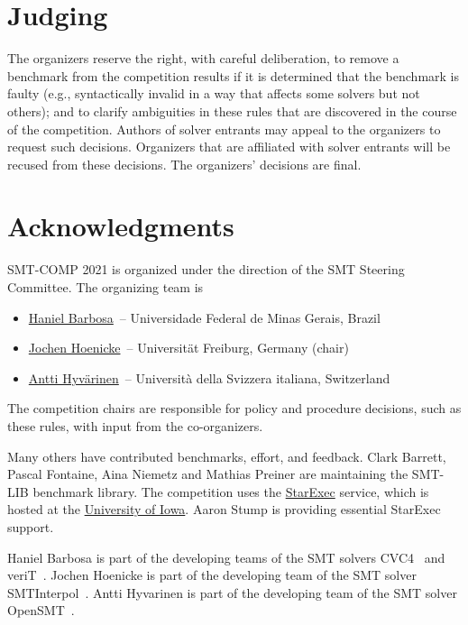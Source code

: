 \documentclass[12pt]{article}
\begin{document}

\section{Judging}

The organizers reserve the right, with careful deliberation, to remove
a benchmark from the competition results if it is determined that the
benchmark is faulty (e.g., syntactically invalid in a way that affects
some solvers but not others); and to clarify ambiguities in these
rules that are discovered in the course of the competition.  Authors
of solver entrants may appeal to the organizers to request such
decisions.  Organizers that are affiliated with solver entrants will
be recused from these decisions.  The organizers' decisions are final.


\section{Acknowledgments}

SMT-COMP 2021 is organized under the direction of the SMT Steering
Committee. The organizing team is
%
\begin{itemize}
\setlength{\itemsep}{0pt}
\item \href{http://homepages.dcc.ufmg.br/~hbarbosa/}{Haniel Barbosa}~-- Universidade Federal de Minas Gerais, Brazil
\item \href{https://jochen-hoenicke.de/}{Jochen Hoenicke}~-- Universit\"at Freiburg, Germany (chair)
\item \href{http://www.inf.usi.ch/postdoc/hyvarinen/}{Antti Hyv\"arinen}~--
    Universit\`a della Svizzera italiana, Switzerland
\end{itemize}
%
The competition chairs are responsible for policy and procedure decisions,
such as these rules, with input from the co-organizers.

Many others have contributed benchmarks, effort, and feedback.  Clark Barrett,
Pascal Fontaine, Aina Niemetz and Mathias Preiner are maintaining the SMT-LIB
benchmark library.
The competition uses the
\href{https://www.starexec.org/}{StarExec} service, which is hosted at
the \href{http://www.cs.uiowa.edu/}{University of Iowa}.  Aaron Stump
is providing essential StarExec support.

%
Haniel Barbosa is part of the developing teams of the SMT solvers
CVC4~\cite{cvc4-smtcomp18} and veriT~\cite{verit}.
%
Jochen Hoenicke is part of the developing team of the SMT solver
SMTInterpol~\cite{smtinterpol}.
Antti Hyvarinen is part of the developing team of the SMT solver
OpenSMT~\cite{opensmt2}.


\pagebreak



\end{document}
